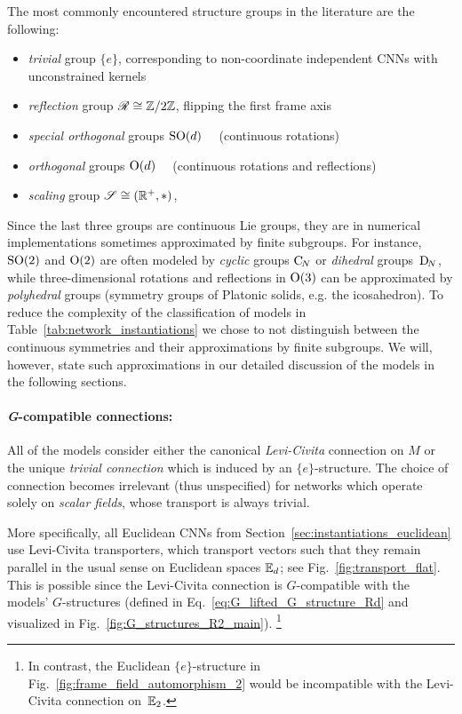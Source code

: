 The most commonly encountered structure groups in the literature are the following:
\begin{itemize}
    \item[{\rule[2.0pt]{2pt}{2pt}}]
        \emph{trivial} group $\{e\}$, corresponding to non-coordinate independent CNNs with unconstrained kernels
    \item[{\rule[2.0pt]{2pt}{2pt}}]
        \emph{reflection} group $\mathscr{R} \cong \mathbb{Z}/2\mathbb{Z}$, flipping the first frame axis
    \item[{\rule[2.0pt]{2pt}{2pt}}]
        \emph{special orthogonal} groups $\operatorname{SO}(d)$
        \ \ (continuous rotations)
    \item[{\rule[2.0pt]{2pt}{2pt}}]
        \emph{orthogonal} groups $\operatorname{O}(d)$
        \ \ (continuous rotations and reflections)
    \item[{\rule[2.0pt]{2pt}{2pt}}]
        \emph{scaling} group $\mathscr{S} \cong (\mathbb{R}^+,*)$,
\end{itemize}
Since the last three groups are continuous Lie groups, they are in numerical implementations sometimes approximated by finite subgroups.
For instance, $\operatorname{SO}(2)$ and $\operatorname{O}(2)$ are often modeled by \emph{cyclic} groups $\operatorname{C}_{\!N}$ or \emph{dihedral} groups~$\operatorname{D}_{\!N}$, while three-dimensional rotations and reflections in $\operatorname{O}(3)$ can be approximated by \emph{polyhedral} groups (symmetry groups of Platonic solids, e.g. the icosahedron).
To reduce the complexity of the classification of models in Table~\ref{tab:network_instantiations} we chose to not distinguish between the continuous symmetries and their approximations by finite subgroups.
We will, however, state such approximations in our detailed discussion of the models in the following sections.





\paragraph{\textit{G}-compatible connections:}
All of the models consider either the canonical \emph{Levi-Civita} connection on $M$ or the unique \emph{trivial connection} which is induced by an $\{e\}$-structure.
The choice of connection becomes irrelevant (thus unspecified) for networks which operate solely on \emph{scalar fields}, whose transport is always trivial.

More specifically, all Euclidean CNNs from Section~\ref{sec:instantiations_euclidean} use Levi-Civita transporters, which transport vectors such that they remain parallel in the usual sense on Euclidean spaces $\mathbb{E}_d$; see Fig.~\ref{fig:transport_flat}.
This is possible since the Levi-Civita connection is $G$-compatible with the models' $G$-structures (defined in Eq.~\eqref{eq:G_lifted_G_structure_Rd} and visualized in Fig.~\ref{fig:G_structures_R2_main}).%
\footnote{
    In contrast, the Euclidean $\{e\}$-structure in Fig.~\ref{fig:frame_field_automorphism_2} would be incompatible with the Levi-Civita connection on~$\mathbb{E}_2$.
}

